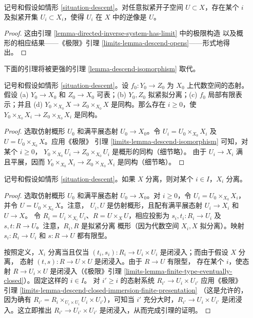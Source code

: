 \begin{lemma}
\label{lemma-descend-opens}
记号和假设如情形 \ref{situation-descent}。对任意拟紧开子空间
$U\subset X$，存在某个 $i$ 及拟紧开集 $U_i\subset X_i$，使得
$U_i$ 在 $X$ 中的逆像是 $U$。
\end{lemma}

\begin{proof}
这由引理 \ref{lemma-directed-inverse-system-has-limit} 中的极限构造
以及概形的相应结果——《极限》引理
\ref{limits-lemma-descend-opens}——形式地得出。
\end{proof}

\noindent
下面的引理将被更强的引理 \ref{lemma-descend-isomorphism} 取代。

\begin{lemma}
\label{lemma-descend-equality}
记号和假设如情形 \ref{situation-descent}。设 $f_0:Y_0\to Z_0$ 为
$X_0$ 上代数空间的态射。假设 (a) $Y_0\to X_0$ 和 $Z_0\to X_0$
可表；(b) $Y_0,Z_0$ 拟紧拟分离；(c) $f_0$ 局部有限表示；并且
(d) $Y_0\times_{X_0}X\to Z_0\times_{X_0}X$ 是同构。那么存在
$i\geq0$，使 $Y_0\times_{X_0}X_i\to Z_0\times_{X_0}X_i$ 是同构。
\end{lemma}

\begin{proof}
选取仿射概形 $U_0$ 和满平展态射 $U_0\to X_0$。令
$U_i=U_0\times_{X_0}X_i$ 及 $U=U_0\times_{X_0}X$。应用《极限》
引理 \ref{limits-lemma-descend-isomorphism} 可知，对某个 $i\geq0$，
$Y_0\times_{X_0}U_i\to Z_0\times_{X_0}U_i$ 是概形的同构（细节略）。
由于 $U_i\to X_i$ 满且平展，因而
$Y_0\times_{X_0}X_i\to Z_0\times_{X_0}X_i$ 是同构（细节略）。
\end{proof}

\begin{lemma}
\label{lemma-descend-separated}
记号和假设如情形 \ref{situation-descent}。如果 $X$ 分离，则对某个
$i\in I$，$X_i$ 分离。
\end{lemma}

\begin{proof}
选取仿射概形 $U_0$ 和满平展态射 $U_0\to X_0$。对 $i\geq0$，令
$U_i=U_0\times_{X_0}X_i$，并令 $U=U_0\times_{X_0}X$。注意，
$U_i,U$ 是仿射概形，且配有满平展态射 $U_i\to X_i$ 和 $U\to X$。
令 $R_i=U_i\times_{X_i}U_i$、$R=U\times_XU$，相应投影为
$s_i,t_i:R_i\to U_i$ 及 $s,t:R\to U$。注意，$R_i,R$ 是拟紧分离
概形（因为代数空间 $X_i,X$ 拟分离）。映射 $s_i:R_i\to U_i$ 和
$s:R\to U$ 都有限型。

按照定义，$X_i$ 分离当且仅当
$(t_i,s_i):R_i\to U_i\times U_i$ 是闭浸入；而由于假设 $X$ 分离，
态射 $(t,s):R\to U\times U$ 是闭浸入。由于 $R\to U$ 有限型，
存在某个 $i$，使态射 $R\to U_i\times U$ 是闭浸入（《极限》引理
\ref{limits-lemma-finite-type-eventually-closed}）。固定这样的 $i\in I$。
对 $i'\geq i$ 的态射系统 $R_{i'}\to U_i\times U_{i'}$ 应用《极限》
引理 \ref{limits-lemma-descend-closed-immersion-finite-presentation}
（这是允许的，因为确有
$R_{i'}=R_i\times_{U_i\times U_i}U_i\times U_{i'}$），可知当 $i'$
充分大时，$R_{i'}\to U_i\times U_{i'}$ 是闭浸入。这立即推出
$R_{i'}\to U_{i'}\times U_{i'}$ 是闭浸入，从而完成引理的证明。
\end{proof}

